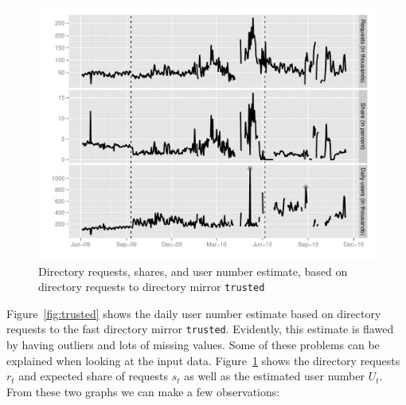 \documentclass{article}
\begin{document}
\begin{figure}[t]
\includegraphics[width=\textwidth]{trusted-details.pdf}
\caption{Directory requests, shares, and user number estimate, based on
directory requests to directory mirror \texttt{trusted}}
\label{fig:trusted-details}
\end{figure}

Figure~\ref{fig:trusted} shows the daily user number estimate based on
directory requests to the fast directory mirror \texttt{trusted}.
Evidently, this estimate is flawed by having outliers and lots of missing
values.
Some of these problems can be explained when looking at the input data.
Figure~\ref{fig:trusted-details} shows the directory requests $r_t$ and
expected share of requests $s_t$ as well as the estimated user number
$U_t$.
From these two graphs we can make a few observations:
\end{document}
